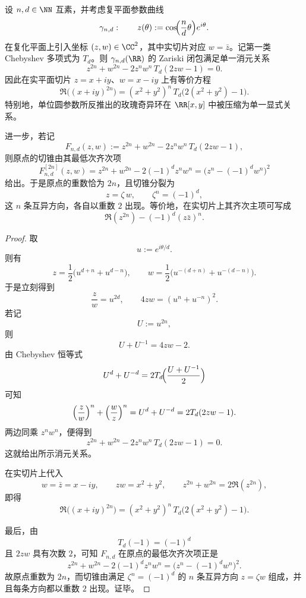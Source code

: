 \begin{theorem}[有理玫瑰族的单位圆反推与奇异环消元公式]\label{thm:xi-time-part62d-rational-rose-singular-ring-elimination}
设 \(n,d\in\NN\) 互素，并考虑复平面参数曲线
\[
\gamma_{n,d}:\qquad
z(\theta):=\cos\!\Bigl(\frac{n}{d}\theta\Bigr)e^{i\theta}.
\]
在复化平面上引入坐标 \((z,w)\in\CC^2\)，其中实切片对应 \(w=\bar z\)。记第一类 Chebyshev 多项式为 \(T_d\)。则 \(\gamma_{n,d}(\RR)\) 的 Zariski 闭包满足单一消元关系
\[
\boxed{\;
z^{2n}+w^{2n}-2z^n w^n\,T_d(2zw-1)=0.\;}
\]
因此在实平面切片 \(z=x+iy\)、\(w=x-iy\) 上有等价方程
\[
\boxed{\;
\Re\!\bigl((x+iy)^{2n}\bigr)
=(x^2+y^2)^n\,T_d\!\bigl(2(x^2+y^2)-1\bigr).\;}
\]
特别地，单位圆参数所反推出的玫瑰奇异环在 \(\RR[x,y]\) 中被压缩为单一显式关系。

进一步，若记
\[
F_{n,d}(z,w):=z^{2n}+w^{2n}-2z^n w^n\,T_d(2zw-1),
\]
则原点的切锥由其最低次齐次项
\[
F_{n,d}^{[2n]}(z,w)
=
z^{2n}+w^{2n}-2(-1)^d z^n w^n
=
\bigl(z^n-(-1)^d w^n\bigr)^2
\]
给出。于是原点的重数恰为 \(2n\)，且切锥分裂为
\[
z=\zeta\,w,
\qquad
\zeta^n=(-1)^d,
\]
这 \(n\) 条互异方向，各自以重数 \(2\) 出现。等价地，在实切片上其齐次主项可写成
\[
\Re(z^{2n})-(-1)^d(z\bar z)^n.
\]
\end{theorem}
\begin{proof}
取
\[
u:=e^{i\theta/d}.
\]
则有
\[
z=\frac12\bigl(u^{d+n}+u^{d-n}\bigr),
\qquad
w=\frac12\bigl(u^{-(d+n)}+u^{-(d-n)}\bigr).
\]
于是立刻得到
\[
\frac{z}{w}=u^{2d},
\qquad
4zw=(u^n+u^{-n})^2.
\]
若记
\[
U:=u^{2n},
\]
则
\[
U+U^{-1}=4zw-2.
\]
由 Chebyshev 恒等式
\[
U^d+U^{-d}
=
2T_d\!\Bigl(\frac{U+U^{-1}}{2}\Bigr)
\]
可知
\[
\Bigl(\frac{z}{w}\Bigr)^n+\Bigl(\frac{w}{z}\Bigr)^n
=
U^d+U^{-d}
=
2T_d(2zw-1).
\]
两边同乘 \(z^n w^n\)，便得到
\[
z^{2n}+w^{2n}-2z^n w^n\,T_d(2zw-1)=0.
\]
这就给出所示消元关系。

在实切片上代入
\[
w=\bar z=x-iy,
\qquad
zw=x^2+y^2,
\qquad
z^{2n}+w^{2n}=2\Re(z^{2n}),
\]
即得
\[
\Re\!\bigl((x+iy)^{2n}\bigr)
=(x^2+y^2)^n\,T_d\!\bigl(2(x^2+y^2)-1\bigr).
\]

最后，由
\[
T_d(-1)=(-1)^d
\]
且 \(2zw\) 具有次数 \(2\)，可知 \(F_{n,d}\) 在原点的最低次齐次项正是
\[
z^{2n}+w^{2n}-2(-1)^d z^n w^n
=
\bigl(z^n-(-1)^d w^n\bigr)^2.
\]
故原点重数为 \(2n\)，而切锥由满足 \(\zeta^n=(-1)^d\) 的 \(n\) 条互异方向 \(z=\zeta w\) 组成，并且每条方向都以重数 \(2\) 出现。证毕。
\end{proof}

